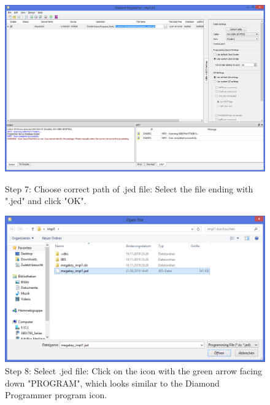 \begin{figure}[H]
  \centering
  \includegraphics[width=0.8\linewidth]{images/diamond07.png}
  \captionsetup{width=0.8\linewidth}
  \caption{Step 7: Choose correct path of .jed file:
           Select the file ending with ".jed" and click "OK".}
  \label{fig:diamond07}

\vspace{5mm}

  \includegraphics[width=0.8\linewidth]{images/diamond08.png}
  \captionsetup{width=0.8\linewidth}
  \caption{Step 8: Select .jed file:
           Click on the icon with the green arrow facing down "PROGRAM",
           which looks similar to the Diamond Programmer program icon.}
  \label{fig:diamond08}
\end{figure}


